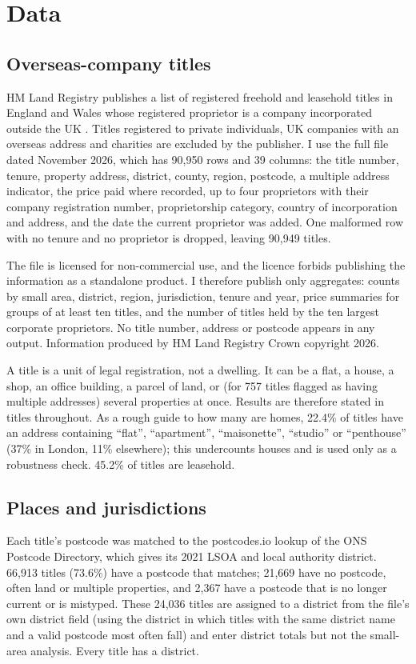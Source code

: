 \documentclass[11pt,a4paper]{article}
\begin{document}
\section{Data}\label{sec:data}
\subsection{Overseas-company titles}
HM Land Registry publishes a list of registered freehold and leasehold titles in England and Wales whose registered proprietor is a company incorporated outside the UK \citep{hmlr2026}. Titles registered to private individuals, UK companies with an overseas address and charities are excluded by the publisher. I use the full file dated November 2026, which has 90,950 rows and 39 columns: the title number, tenure, property address, district, county, region, postcode, a multiple address indicator, the price paid where recorded, up to four proprietors with their company registration number, proprietorship category, country of incorporation and address, and the date the current proprietor was added. One malformed row with no tenure and no proprietor is dropped, leaving 90,949 titles.

The file is licensed for non-commercial use, and the licence forbids publishing the information as a standalone product. I therefore publish only aggregates: counts by small area, district, region, jurisdiction, tenure and year, price summaries for groups of at least ten titles, and the number of titles held by the ten largest corporate proprietors. No title number, address or postcode appears in any output. Information produced by HM Land Registry \textcopyright{} Crown copyright 2026.

A title is a unit of legal registration, not a dwelling. It can be a flat, a house, a shop, an office building, a parcel of land, or (for 757 titles flagged as having multiple addresses) several properties at once. Results are therefore stated in titles throughout. As a rough guide to how many are homes, 22.4\% of titles have an address containing ``flat'', ``apartment'', ``maisonette'', ``studio'' or ``penthouse'' (37\% in London, 11\% elsewhere); this undercounts houses and is used only as a robustness check. 45.2\% of titles are leasehold.

\subsection{Places and jurisdictions}
Each title's postcode was matched to the postcodes.io lookup of the ONS Postcode Directory, which gives its 2021 LSOA and local authority district. 66,913 titles (73.6\%) have a postcode that matches; 21,669 have no postcode, often land or multiple properties, and 2,367 have a postcode that is no longer current or is mistyped. These 24,036 titles are assigned to a district from the file's own district field (using the district in which titles with the same district name and a valid postcode most often fall) and enter district totals but not the small-area analysis. Every title has a district.
\end{document}
